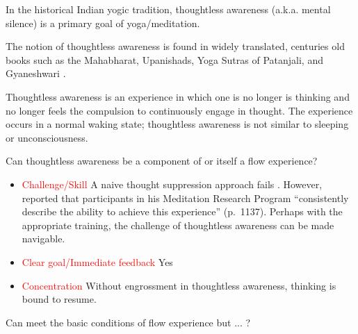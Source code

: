 \documentclass[10pt,utf8x]{beamer}
\begin{document}
\begin{frame}
In the historical Indian yogic tradition, thoughtless awareness
(a.k.a. mental silence) is a primary goal of yoga/meditation.

The notion of thoughtless awareness is found in widely translated,
centuries old
books such as the Mahabharat, Upanishads, Yoga Sutras of Patanjali,
and Gyaneshwari \cite[pp.~93--94]{manocha2009}.

Thoughtless awareness is an experience in which one is
no longer is thinking and
no longer feels the compulsion to continuously engage in thought.
The experience occurs in a normal waking state;
thoughtless awareness is not similar to sleeping or unconsciousness.
\end{frame}

\begin{frame}
Can thoughtless awareness be a component of or itself a flow experience? 

\begin{itemize}
\item \textcolor{red}{Challenge/Skill} A naive thought suppression approach fails \cite{wegner2003}.
However,  reported that participants in his
Meditation Research Program ``consistently describe the
ability to achieve this experience'' (p.~1137).
Perhaps with the appropriate training,
the challenge of thoughtless awareness can be made navigable.

\item \textcolor{red}{Clear goal/Immediate feedback} Yes

\item \textcolor{red}{Concentration} Without engrossment
in thoughtless awareness, thinking is bound to resume.

\end{itemize}

Can meet the basic conditions of flow experience but ... ?
\end{frame}
\end{document}
